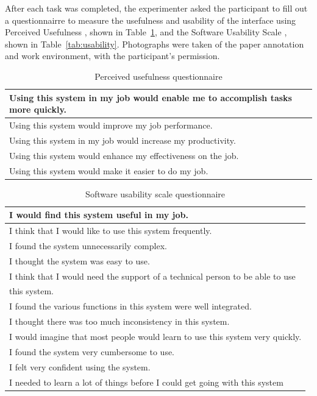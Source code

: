 
After each task was completed, the experimenter asked the participant to fill out a questionnairre to measure the
usefulness and usability of the interface using Perceived Usefulness \citep{Davis1989}, shown in
Table~\ref{tab:usefulness}, and the Software Usability Scale \citep{Brooke1996}, shown in Table~\ref{tab:usability}.
Photographs were taken of the paper annotation and work environment, with the participant's permission.

\begin{table}
  {\small
  \begin{tabular}{ | l | }
  \hline
  Using this system in my job would enable me to accomplish tasks more quickly. \\ \hline
  Using this system would improve my job performance. \\ \hline
  Using this system in my job would increase my productivity. \\ \hline
  Using this system would enhance my effectiveness on the job. \\ \hline
  Using this system would make it easier to do my job. \\
  \hline
  \end{tabular}
  }
  \caption{Perceived usefulness questionnaire \citep{Davis1989}}
  \label{tab:usefulness}
\end{table}

\begin{table}
  {\small
  \begin{tabular}{ | l | }
  \hline
  I would find this system useful in my job. \\ \hline
  I think that I would like to use this system frequently. \\ \hline
  I found the system unnecessarily complex. \\ \hline
  I thought the system was easy to use. \\ \hline
  I think that I would need the support of a technical person to be able to use \\
  this system. \\ \hline
  I found the various functions in this system were well integrated. \\ \hline
  I thought there was too much inconsistency in this system. \\ \hline
  I would imagine that most people would learn to use this system very quickly. \\ \hline
  I found the system very cumbersome to use. \\ \hline
  I felt very confident using the system. \\ \hline
  I needed to learn a lot of things before I could get going with this system \\
  \hline
  \end{tabular}
  }
  \caption{Software usability scale questionnaire \citep{Brooke1996}}
  \label{tab:sus}
\end{table}

